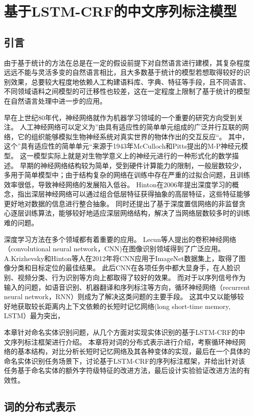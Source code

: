 \chapter{基于LSTM-CRF的中文序列标注模型}
\label{chap:3}
\section{引言}
由于基于统计的方法在总是在一定的假设前提下对自然语言进行建模，其复杂程度远远不能与灵活多变的自然语言相比，且大多数基于统计的模型若想取得较好的识别效果，总要较大程度地依赖人工构建语料库、字典、特征等手段，且不同语言、不同领域语料之间模型的可迁移性也较差，这在一定程度上限制了基于统计的模型在自然语言处理中进一步的应用。

早在上世纪80年代，神经网络就作为机器学习领域的一个重要的研究方向受到关注。
人工神经网络可以定义为”由具有适应性的简单单元组成的广泛并行互联的网络，它的组织能够模拟生物神经系统对真实世界的物体作出的交互反应“。
其中，这个”具有适应性的简单单元“来源于1943年McCulloch和Pitts提出的M-P神经元模型。
这一模型实际上就是对生物学意义上的神经元进行的一种形式化的数学描述。
早期的神经网络结构较为简单，受到硬件计算能力的限制，一般层数较少，多用于简单模型中；由于结构复杂的网络在训练中存在严重的过拟合问题，且训练效率很低，导致神经网络的发展陷入低谷。
Hinton在2006年提出深度学习的概念，指出深层神经网络可以通过组合低层特征获得抽象的高层特征，这些特征能够更好地对数据的信息进行整合抽象。
同时还提出了基于深度置信网络的非监督贪心逐层训练算法，能够较好地适应深层网络结构，解决了当网络层数较多时的训练难的问题。

深度学习方法在多个领域都有着重要的应用。
Lecun等人提出的卷积神经网络（convolutional neural network，CNN)在图像识别领域得到了广泛应用。
A.Krizhevsky和Hinton等人在2012年将CNN应用于ImageNet数据集上，取得了图像分类和目标定位的最佳结果。
此后CNN在各项任务中都大显身手，在人脸识别、视频分类、行为识别等方向上都取得了较好的效果。
而对于以序列信号作为输入的问题，如语音识别、机器翻译和序列标注等方向，循环神经网络（recurrent neural network，RNN）则成为了解决这类问题的主要手段。
这其中又以能够较好地获取较长距离内上下文依赖的长短时记忆网络(long short-time memory, LSTM）最为突出，

本章针对命名实体识别问题，从几个方面对实现实体识别的基于LSTM-CRF的中文序列标注框架进行介绍。
本章将对词的分布式表示进行介绍，考察循环神经网络的基本结构，对比分析长短时记忆网络及其各种变体的实现，最后在一个具体的命名实体识别任务场景下，讨论基于LSTM-CRF的序列标注框架，并给出针对该任务基于命名实体的额外字符级特征的改进方法，最后设计实验验证改进方法的有效性。

\section{词的分布式表示}

